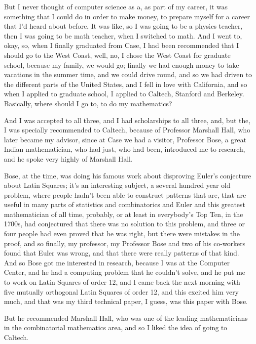 \documentclass[]{article}
\begin{document}
But I never thought of computer science as a, as part of my career, it
was something that I could do in order to make money, to prepare myself
for a career that I'd heard about before. It was like, so I was going to
be a physics teacher, then I was going to be math teacher, when I
switched to math. And I went to, okay, so, when I finally graduated from
Case, I had been recommended that I should go to the West Coast, well,
no, I chose the West Coast for graduate school, because my family, we
would go; finally we had enough money to take vacations in the summer
time, and we could drive round, and so we had driven to the different
parts of the United States, and I fell in love with California, and so
when I applied to graduate school, I applied to Caltech, Stanford and
Berkeley. Basically, where should I go to, to do my mathematics?

And I was accepted to all three, and I had scholarships to all three,
and, but the, I was specially recommended to Caltech, because of
Professor Marshall Hall, who later became my advisor, since at Case we
had a visitor, Professor Bose, a great Indian mathematician, who had
just, who had been, introduced me to research, and he spoke very highly
of Marshall Hall.

Bose, at the time, was doing his famous work about disproving Euler's
conjecture about Latin Squares; it's an interesting subject, a several
hundred year old problem, where people hadn't been able to construct
patterns that are, that are useful in many parts of statistics and
combinatorics and Euler and this greatest mathematician of all time,
probably, or at least in everybody's Top Ten, in the 1700s, had
conjectured that there was no solution to this problem, and three or
four people had even proved that he was right, but there were mistakes
in the proof, and so finally, my professor, my Professor Bose and two of
his co-workers found that Euler was wrong, and that there were really
patterns of that kind. And so Bose got me interested in research,
because I was at the Computer Center, and he had a computing problem
that he couldn't solve, and he put me to work on Latin Squares of order
12, and I came back the next morning with five mutually orthogonal Latin
Squares of order 12, and this excited him very much, and that was my
third technical paper, I guess, was this paper with Bose.

But he recommended Marshall Hall, who was one of the leading
mathematicians in the combinatorial mathematics area, and so I liked the
idea of going to Caltech.
\end{document}
